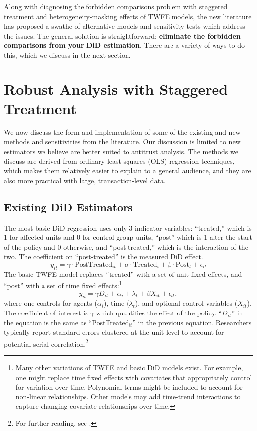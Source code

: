 \documentclass[12pt]{article}
\begin{document}
Along with diagnosing the forbidden comparisons problem with staggered treatment and heterogeneity-masking effects of TWFE models, the new literature has proposed a swathe of alternative models and sensitivity tests which address the issues. The general solution is straightforward: \textbf{eliminate the forbidden comparisons from your DiD estimation}. There are a variety of ways to do this, which we discuss in the next section.

\section{Robust Analysis with Staggered Treatment} \label{sec:equations}
We now discuss the form and implementation of some of the existing and new methods and sensitivities from the literature. Our discussion is limited to new estimators we believe are better suited to antitrust analysis. The methods we discuss are derived from ordinary least squares (OLS) regression techniques, which makes them relatively easier to explain to a general audience, and they are also more practical with large, transaction-level data. 
\subsection{Existing DiD Estimators}
The most basic DiD regression uses only 3 indicator variables: “treated,” which is 1 for affected units and 0 for control group units, “post” which is 1 after the start of the policy and 0 otherwise, and “post-treated,” which is the interaction of the two. The coefficient on “post-treated” is the measured DiD effect.
\begin{equation}
    y_{it} = \gamma \cdot \text{PostTreated}_{it} + \alpha\cdot \text{Treated}_i + \beta \cdot \text{Post}_t + \epsilon_{it}
\end{equation}
The basic TWFE model replaces “treated” with a set of unit fixed effects, and “post” with a set of time fixed effects:\footnote{Many other variations of TWFE and basic DiD models exist. For example, one might replace time fixed effects with covariates that appropriately control for variation over time. Polynomial terms might be included to account for non-linear relationships. Other models may add time-trend interactions to capture changing covariate relationships over time.}
\begin{equation}
    y_{it} = \gamma D_{it} + \alpha_i + \lambda_t + \beta X_{it} + \epsilon_{it},    
\end{equation}
where one controls for agents ($\alpha_i$), time ($\lambda_t$), and optional control variables ($X_{it}$). The coefficient of interest is $\gamma$ which quantifies the effect of the policy. “$D_{it}$” in the equation is the same as “PostTreated$_{it}$” in the previous equation. Researchers typically report standard errors clustered at the unit level to account for potential serial correlation.\footnote{For further reading, see \citet{bertrand2004}.} 
\end{document}
